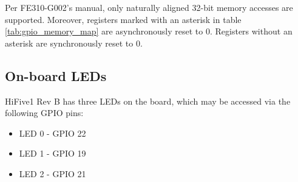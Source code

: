 Per FE310-G002's manual\cite{fe310g002man}, only naturally aligned 32-bit memory accesses are supported. Moreover, registers marked with an asterisk in table \ref{tab:gpio_memory_map} are asynchronously reset to 0. Registers without an asterisk are synchronously reset to 0.

\subsection{On-board LEDs}
HiFive1 Rev B has three LEDs on the board, which may be accessed via the following GPIO pins:
\begin{itemize}
    \item LED 0 - GPIO 22
    \item LED 1 - GPIO 19
    \item LED 2 - GPIO 21
\end{itemize}